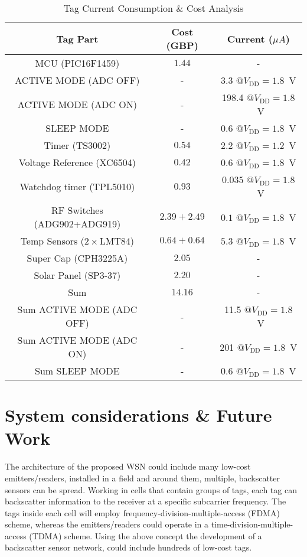 \documentclass[journal]{IEEEtran}
\begin{document}
\begin{table}[t]	
\renewcommand{\arraystretch}{1.4}
\centering
\caption{Tag Current Consumption \& Cost Analysis}
\scalebox{0.9}
{
\begin{tabular}{c||c||c}
\hline
\hline
 Tag Part & Cost (GBP)  & Current ($\mu A$)\\
\hline
\hline
MCU (PIC16F1459)&$1.44$ & -\\
 ACTIVE MODE (ADC OFF) & -& 3.3 $@ V_\text{DD}=1.8$~V\\
 ACTIVE MODE (ADC ON) &- & 198.4 $@ V_\text{DD}=1.8$~V\\
 SLEEP MODE &- & 0.6 $@ V_\text{DD}=1.8$~V\\
\hline
Timer (TS3002)&$0.54$ & $2.2$ $@ V_\text{DD}=1.2$~V\\
\hline
Voltage Reference (XC6504)& $0.42$ & $0.6$ $@ V_\text{DD}=1.8$~V\\
\hline
Watchdog timer (TPL5010) & $0.93$ & $0.035$ $@ V_\text{DD}=1.8$~V \\
\hline
RF Switches (ADG902+ADG919) & $2.39+2.49$ &  $0.1$ $@ V_\text{DD}=1.8$~V\\
\hline
Temp Sensors ($2 \times$LMT84)&$0.64+0.64$& $5.3$ $@ V_\text{DD}=1.8$~V \\
\hline
Super Cap (CPH3225A)&$2.05$& - \\
\hline
Solar Panel (SP3-37)&$2.20$& - \\
\hline
\hline
Sum&$14.16$& -\\
Sum ACTIVE MODE (ADC OFF) &-& 11.5 $@ V_\text{DD}=1.8$~V\\
Sum ACTIVE MODE (ADC ON) &-&  201  $@ V_\text{DD}=1.8$~V\\
Sum SLEEP MODE &- & 0.6 $@ V_\text{DD}=1.8$~V\\
\hline
\hline
\end{tabular}
}
\label{tab:BOM}
\end{table}
%
\section{System considerations \& Future Work}
\label{sec:comparison}
%
%
The architecture of the proposed WSN  could include many  low-cost emitters/readers, installed in a
field and around them, multiple, backscatter sensors can be  spread.
%
Working in cells that contain groups of tags, each tag can backscatter information to the receiver at a   specific subcarrier frequency.
%
The tags inside each cell will employ  frequency-division-multiple-access (FDMA) scheme, whereas the  emitters/readers  could operate in a time-division-multiple-access (TDMA) scheme. 
%
Using the above concept the development of a backscatter  sensor network,  could include hundreds of low-cost tags.
\end{document}

